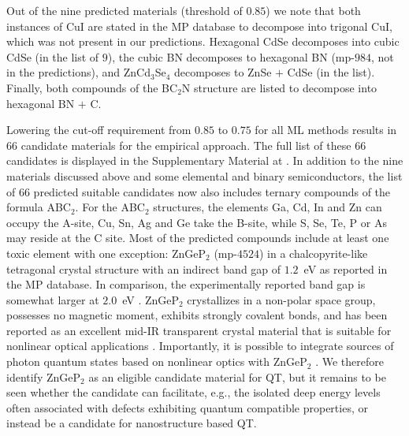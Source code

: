 \documentclass[superscriptaddress,unsortedaddress,
 amsmath,amssymb,
 aps,
]{revtex4-2}
\begin{document}
Out of the nine predicted materials (threshold of $0.85$) we note that both instances of CuI are stated in the MP database to decompose into trigonal CuI, which was not present in our predictions. Hexagonal CdSe decomposes into cubic CdSe (in the list of $9$), the cubic BN decomposes to hexagonal BN (mp-$984$, not in the predictions), and ZnCd$_3$Se$_4$ decomposes to ZnSe $+$ CdSe (in the list). Finally, both compounds of the BC$_2$N structure are listed to decompose into hexagonal BN $+$ C. 

Lowering the cut-off requirement from $0.85$ to $0.75$ for all ML methods results in $66$ candidate materials for the empirical approach.  
The full list of these $66$ candidates is displayed in the Supplementary Material at \cite{supplementary}. 
In addition to the nine materials discussed above and some elemental and binary semiconductors, the list of $66$ predicted suitable candidates now also includes ternary compounds of the formula ABC$_2$. For the ABC$_2$ structures, the elements Ga, Cd, In and Zn can occupy the A-site, Cu, Sn, Ag and Ge take the B-site, while S, Se, Te, P or As may reside at the C site. Most of the predicted compounds include at least one toxic element with one exception: ZnGeP$_2$ (mp-$4524$) in a chalcopyrite-like tetragonal crystal structure with an indirect band gap of $1.2$~eV \cite{Zhang2015} as reported in the MP database. In comparison, the experimentally reported band gap is somewhat larger at $2.0$~eV \cite{Xing1989}. 
ZnGeP$_2$ crystallizes in a non-polar space group, possesses no magnetic moment, exhibits strongly covalent bonds, and has been reported as an excellent mid-IR transparent crystal material that is suitable for nonlinear optical applications \cite{Zhang2015}. Importantly, it is possible to integrate sources of photon quantum states based on nonlinear optics with ZnGeP$_2$ \cite{Caspani2017}. 
We therefore identify ZnGeP$_2$ as an eligible candidate material for QT, but it remains to be seen whether the candidate can facilitate, e.g., the isolated deep energy levels often associated with defects exhibiting quantum compatible properties, or instead be a candidate for nanostructure based QT.  
\end{document}
